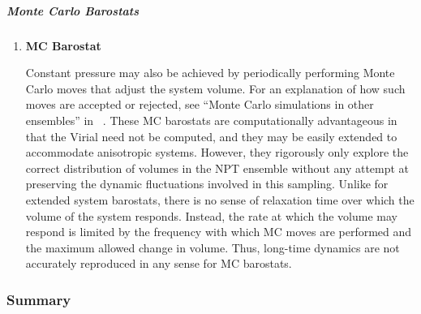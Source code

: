 \documentclass[9pt,bestpractices]{livecoms}
\begin{document}
\subparagraph{Monte Carlo Barostats}
\begin{enumerate}[listparindent=\parindent]
\item \textbf{MC Barostat}

Constant pressure may also be achieved by periodically performing Monte Carlo moves that adjust the system volume.
For an explanation of how such moves are accepted or rejected, see ``Monte Carlo simulations in other ensembles'' in ~\citet{ShellNotes}.
These MC barostats are computationally advantageous in that the Virial need not be computed, and they may be easily extended to accommodate anisotropic systems.
However, they rigorously only explore the correct distribution of volumes in the NPT ensemble without any attempt at preserving the dynamic fluctuations involved in this sampling.
Unlike for extended system barostats, there is no sense of relaxation time over which the volume of the system responds.
Instead, the rate at which the volume may respond is limited by the frequency with which MC moves are performed and the maximum allowed change in volume.
Thus, long-time dynamics are not accurately reproduced in any sense for MC barostats.

\end{enumerate}

\subsubsection{Summary}
\end{document}
